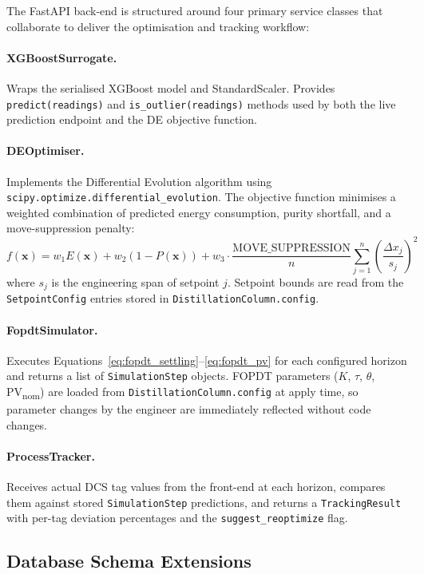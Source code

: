 The FastAPI back-end is structured around four primary service classes
that collaborate to deliver the optimisation and tracking workflow:

\paragraph{XGBoostSurrogate.} Wraps the serialised XGBoost model and
StandardScaler.  Provides \texttt{predict(readings)} and
\texttt{is\_outlier(readings)} methods used by both the live prediction
endpoint and the DE objective function.

\paragraph{DEOptimiser.} Implements the Differential Evolution algorithm
using \texttt{scipy.optimize.differential\_evolution}.  The objective
function minimises a weighted combination of predicted energy consumption,
purity shortfall, and a move-suppression penalty:
\[
  f(\mathbf{x}) = w_1 E(\mathbf{x}) + w_2 (1 - P(\mathbf{x}))
                + w_3 \cdot \frac{\text{MOVE\_SUPPRESSION}}{n}
                  \sum_{j=1}^{n}\!\left(\frac{\Delta x_j}{s_j}\right)^{\!2}
\]
where $s_j$ is the engineering span of setpoint $j$.  Setpoint bounds are
read from the \texttt{SetpointConfig} entries stored in
\texttt{DistillationColumn.config}.

\paragraph{FopdtSimulator.} Executes Equations~\eqref{eq:fopdt_settling}--\eqref{eq:fopdt_pv}
for each configured horizon and returns a list of \texttt{SimulationStep}
objects.  FOPDT parameters ($K$, $\tau$, $\theta$, PV\textsubscript{nom})
are loaded from \texttt{DistillationColumn.config} at apply time, so
parameter changes by the engineer are immediately reflected without code
changes.

\paragraph{ProcessTracker.} Receives actual DCS tag values from the
front-end at each horizon, compares them against stored
\texttt{SimulationStep} predictions, and returns a \texttt{TrackingResult}
with per-tag deviation percentages and the \texttt{suggest\_reoptimize} flag.

\subsection{Database Schema Extensions}

